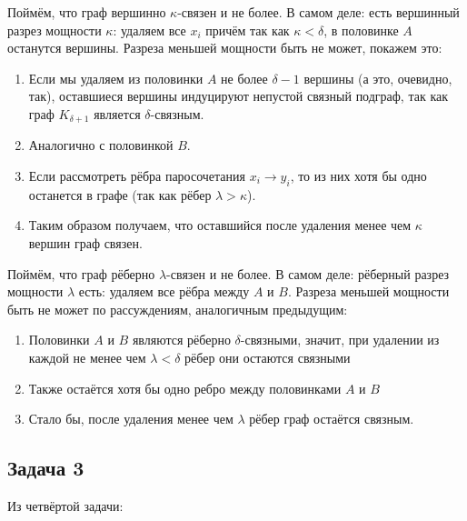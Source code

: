 	Поймём, что граф вершинно $\kappa$-связен и не более.
	В самом деле: есть вершинный разрез мощности $\kappa$: удаляем все $x_i$
	причём так как $\kappa < \delta$, в половинке $A$ останутся вершины.
	Разреза меньшей мощности быть не может, покажем это:
	\begin{enumerate}
		\item Если мы удаляем из половинки $A$ не более $\delta-1$ вершины (а это, очевидно, так), оставшиеся вершины индуцируют непустой связный подграф, так как граф $K_{\delta+1}$ является $\delta$-связным.
		\item Аналогично с половинкой $B$.
		\item Если рассмотреть рёбра паросочетания $x_i \to y_i$, то из них хотя бы одно останется в графе (так как рёбер $\lambda>\kappa$).
		\item Таким образом получаем, что оставшийся после удаления менее чем $\kappa$ вершин граф связен.
	\end{enumerate}

	Поймём, что граф рёберно $\lambda$-связен и не более.
	В самом деле: рёберный разрез мощности $\lambda$ есть: удаляем все рёбра между $A$ и $B$.
	Разреза меньшей мощности быть не может по рассуждениям, аналогичным предыдущим:
	\begin{enumerate}
		\item Половинки $A$ и $B$ являются рёберно $\delta$-связными, значит, при удалении из каждой не менее чем $\lambda<\delta$ рёбер они остаются связными
		\item Также остаётся хотя бы одно ребро между половинками $A$ и $B$
		\item Стало бы, после удаления менее чем $\lambda$ рёбер граф остаётся связным.
	\end{enumerate}
	
\subsection{Задача 3}
	Из четвёртой задачи:

	\begin{center}
	\end{center}

